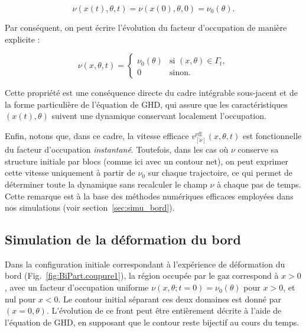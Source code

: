 \begin{equation}
\nu(x(t),\theta,t) = \nu(x(0),\theta,0) = \nu_0(\theta).
\end{equation}

Par conséquent, on peut écrire l’évolution du facteur d’occupation de manière explicite :

\begin{equation}
\label{eq:contour_support}
\nu(x, \theta, t) =
\begin{cases}
\nu_0(\theta) & \text{si } (x,\theta) \in \Gamma_t, \\
0 & \text{sinon}.
\end{cases}
\end{equation}

Cette propriété est une conséquence directe du cadre intégrable sous-jacent et de la forme particulière de l’équation de GHD, qui assure que les caractéristiques $(x(t),\theta)$ suivent une dynamique conservant localement l’occupation.

\medskip

Enfin, notons que, dans ce cadre, la vitesse efficace $v^{\mathrm{eff}}_{[\nu]}(x,\theta,t)$ est fonctionnelle du facteur d’occupation \textit{instantané}. Toutefois, dans les cas où $\nu$ conserve sa structure initiale par blocs (comme ici avec un contour net), on peut exprimer cette vitesse uniquement à partir de $\nu_0$ sur chaque trajectoire, ce qui permet de déterminer toute la dynamique sans recalculer le champ $\nu$ à chaque pas de temps. Cette remarque est à la base des méthodes numériques efficaces employées dans nos simulations (voir section~\ref{sec:simu_bord}).


\subsection{Simulation de la déformation du bord}

Dans la configuration initiale correspondant à l'expérience de déformation du bord (Fig.~\ref{fig:BiPart.coupure1}), la région occupée par le gaz correspond à \(x > 0\), avec un facteur d’occupation uniforme \(\nu(x,\theta; t=0) = \nu_0(\theta)\) pour \(x > 0\), et nul pour \(x < 0\). Le contour initial séparant ces deux domaines est donné par \((x = 0, \theta)\). L’évolution de ce front peut être entièrement décrite à l’aide de l’équation de GHD, en supposant que le contour reste bijectif au cours du temps.


